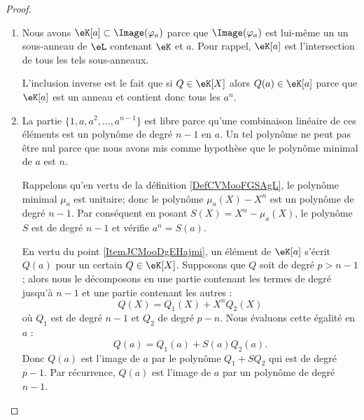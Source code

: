 \begin{proof}
    \begin{enumerate}
        \item
            Nous avons \( \eK[a]\subset \Image(\varphi_a)\) parce que \( \Image(\varphi_a)\) est lui-même un un sous-anneau de \( \eL\) contenant \( \eK\) et \( a\). Pour rappel, \( \eK[a]\) est l'intersection de tous les tels sous-anneaux.
            
            L'inclusion inverse est le fait que si \( Q\in \eK[X]\) alors \( Q(a)\in \eK[a]\) parce que \( \eK[a]\) est un anneau et contient donc tous les \( a^n\).
        \item
            La partie \( \{ 1,a,a^2,\ldots, a^{n-1} \}\) est libre parce qu'une combinaison linéaire de ces éléments est un polynôme de degré \( n-1\) en \( a\). Un tel polynôme ne peut pas être nul parce que nous avons mis comme hypothèse que le polynôme minimal de \( a\) est \( n\).

            Rappelons qu'en vertu de la définition \ref{DefCVMooFGSAgL}, le polynôme minimal \( \mu_a\) est unitaire; donc le polynôme \( \mu_a(X)-X^n\) est un polynôme de degré \( n-1\). Par conséquent en posant \( S(X)=X^n-\mu_a(X)\), le polynôme \( S\) est de degré \( n-1\) et vérifie \( a^n=S(a)\).  

            En vertu du point \ref{ItemJCMooDgEHajmi}, un élément de \( \eK[a]\) s'écrit \( Q(a)\) pour un certain \( Q\in\eK[X]\). Supposons que \( Q\) soit de degré \( p>n-1\); alors nous le décomposons en une partie contenant les termes de degré jusqu'à \( n-1\) et une partie contenant les autres :
            \begin{equation}
                Q(X)=Q_1(X)+X^nQ_2(X)
            \end{equation}
            où \( Q_1\) est de degré \( n-1\) et \( Q_2\) de degré \( p-n\). Nous évaluons cette égalité en \( a\) :
            \begin{equation}
                Q(a)=Q_1(a)+S(a)Q_2(a).
            \end{equation}
            Donc \( Q(a)\) est l'image de \( a\) par le polynôme \( Q_1+SQ_2\) qui est de degré \( p-1\). Par récurrence, \( Q(a)\) est l'image de \( a\) par un polynôme de degré \( n-1\).


\end{enumerate}
\end{proof}
